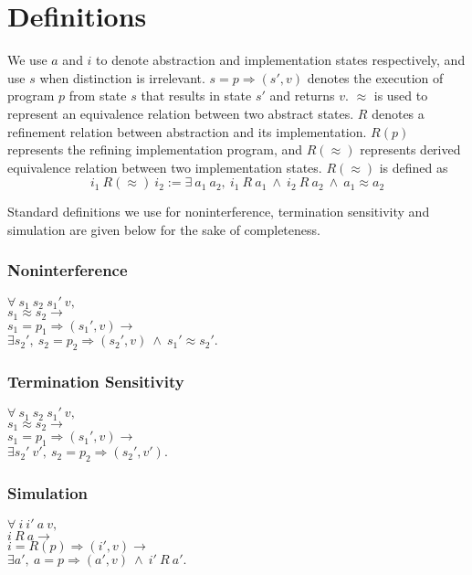 \section{Definitions}

We use $a$ and $i$ to denote abstraction and implementation states respectively, and use $s$ when distinction is irrelevant.
$s =p\Rightarrow (s', v)$ denotes the execution of program $p$ from state $s$ that results in state $s'$ and returns $v$. $\approx$ is used to represent an equivalence relation between two abstract states. $R$ denotes a refinement relation between abstraction and its implementation. $R(p)$ represents the refining implementation program, and $R(\approx)$ represents derived equivalence relation between two implementation states. $R(\approx)$ is defined as 
$$
i_1\ R(\approx)\ i_2 := \exists\ a_1\ a_2,\ i_1\ R\ a_1\ \wedge\ i_2\ R\ a_2\ \wedge\ a_1 \approx a_2
$$

Standard definitions we use for noninterference, termination sensitivity and simulation are given below for the sake of completeness.
\subsubsection*{Noninterference}

$\forall\ s_1\ s_2\ s_1'\ v,$\\
$s_1\approx s_2 \rightarrow$\\
$s_1 =p_1\Rightarrow (s_1', v) \rightarrow$\\
$\exists s_2',\ s_2 =p_2\Rightarrow (s_2', v)\ \wedge\ s_1'\approx s_2'.$

\subsubsection*{Termination Sensitivity}

$\forall\ s_1\ s_2\ s_1'\ v,$\\
$s_1\approx s_2 \rightarrow$\\
$s_1 =p_1\Rightarrow (s_1', v) \rightarrow$\\
$\exists s_2'\ v',\ s_2 =p_2\Rightarrow (s_2', v').$

\subsubsection*{Simulation}

$\forall\ i\ i'\ a\ v,$\\
$i\ R\ a \rightarrow$\\
$i =R(p)\Rightarrow (i', v) \rightarrow$\\
$\exists a',\ a =p\Rightarrow (a', v)\ \wedge\ i'\ R\ a'.$

